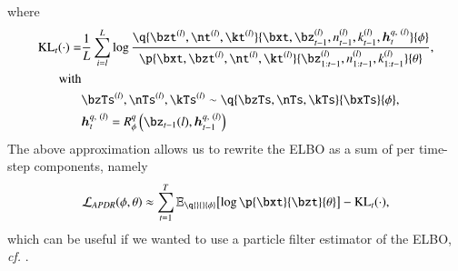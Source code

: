 where
\begin{equation}
\begin{aligned}
    \operatorname{KL}_t(\cdot) = &\frac{1}{L} \sum_{i=l}^L \log{\frac{ \q{\bzt^{(l)}, \nt^{(l)}, \kt^{(l)}}{\bxt, \bz_{t-1}^{(l)}, n_{t-1}^{(l)}, k_{t-1}^{(l)}, \bm{h}_t^{q,\ (l)}}{\phi} }{ \p{\bxt, \bzt^{(l)}, \nt^{(l)}, \kt^{(l)}}{\bz_{1:t-1}^{(l)}, n_{1:t-1}^{(l)}, k_{1:t-1}^{(l)}}{\theta} }},\\
%    
    \text{with}\\
%    
    &\bzTs^{(l)}, \nTs^{(l)}, \kTs^{(l)} \sim \q{\bzTs, \nTs, \kTs}{\bxTs}{\phi},\\
%    
    &\bm{h}_t^{q,\ (l)} = R^q_\phi \left( \bz_{t-1}{(l)}, \bm{h}_{t-1}^{q,\ (l)} \right)
\end{aligned}
\end{equation}
The above approximation allows us to rewrite the ELBO as a sum of per time-step components, namely
\begin{equation}
    \loss[APDR]{\phi, \theta} \approx \sum_{t=1}^T \expc{ \log \p{\bxt}{\bzt}{\theta} }{}{ \q{}{}{\phi} } - \operatorname{KL}_t(\cdot),
\end{equation}
which can be useful if we wanted to use a particle filter estimator of the ELBO, \emph{cf.} .